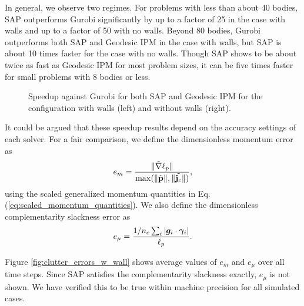 In general, we observe two regimes. For problems with less than about 40 bodies,
SAP outperforms Gurobi significantly by up to a factor of 25 in the case with
walls and up to a factor of 50 with no walls. Beyond 80 bodies, Gurobi
outperforms both SAP and Geodesic IPM in the case with walls, but SAP is about
10 times faster for the case with no walls. Though SAP shows to be about twice
as fast as Geodesic IPM for most problem sizes, it can be five times faster for
small problems with 8 bodies or less.
\begin{figure}[!h]
	\centering
	\caption{\label{fig:clutter_speedup} 
	Speedup against Gurobi for both SAP and Geodesic IPM for the configuration with walls (left) and without walls (right).}
\end{figure}

It could be argued that these speedup results depend on the accuracy settings of
each solver. For a fair comparison, we define the dimensionless momentum error
as
\begin{equation}
	e_m = \frac{\Vert\tilde{\nabla}\ell_p\Vert}{\max(\Vert\tilde{\mf{p}}\Vert,\Vert\tilde{\mf{j}_c}\Vert)},
	\label{eq:momentum_error}
\end{equation}
using the scaled generalized momentum quantities in Eq.
(\ref{eq:scaled_momentum_quantities}). We also define the dimensionless
complementarity slackness error as
\begin{equation}
	e_\mu = \frac{1/n_c\sum_i|\bm{g}_i\cdot\bgamma_i|}{\ell_p}.
	\label{eq:slackness_error}
\end{equation}

Figure \ref{fig:clutter_errors_w_wall} shows average values of $e_m$ and $e_\mu$
over all time steps. Since SAP satisfies the complementarity slackness exactly,
$e_\mu$ is not shown. We have verified this to be true within machine precision
for all simulated cases.

